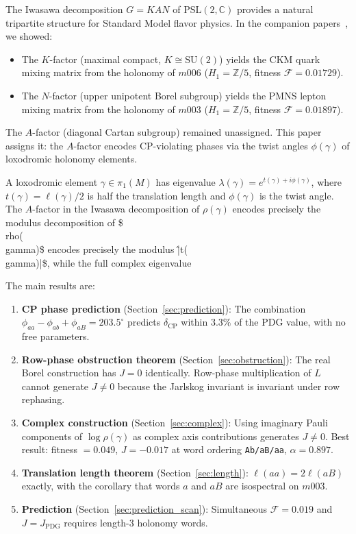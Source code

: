 \documentclass[floatfix,aps,prd,twocolumn,showpacs,superscriptaddress,longbibliography]{revtex4-2}
\newcommand{\PSL}{\mathrm{PSL}(2,\mathbb{C})}
\newcommand{\SUtwo}{\mathrm{SU}(2)}
\begin{document}
The Iwasawa decomposition $G = KAN$ of $\PSL$ provides a natural
tripartite structure for Standard Model flavor physics.
In the companion papers~\cite{Gentry:CKM,Gentry:PMNS}, we showed:
\begin{itemize}
\item The $K$-factor (maximal compact, $K \cong \SUtwo$) yields the
CKM quark mixing matrix from the holonomy of $m006$
($H_1 = \mathbb{Z}/5$, fitness $\mathcal{F} = 0.01729$).
\item The $N$-factor (upper unipotent Borel subgroup) yields the
PMNS lepton mixing matrix from the holonomy of $m003$
($H_1 = \mathbb{Z}/5$, fitness $\mathcal{F} = 0.01897$).
\end{itemize}
The $A$-factor (diagonal Cartan subgroup) remained unassigned.
This paper assigns it: the $A$-factor encodes CP-violating phases
via the twist angles $\phi(\gamma)$ of loxodromic holonomy elements.

A loxodromic element $\gamma \in \pi_1(M)$ has eigenvalue
$\lambda(\gamma) = e^{t(\gamma) + i\phi(\gamma)}$, where
$t(\gamma) = \ell(\gamma)/2$ is half the translation length and
$\phi(\gamma)$ is the twist angle. The $A$-factor in the Iwasawa
decomposition of $\rho(\gamma)$ encodes precisely the modulus
decomposition of \$\\rho(\\gamma)\$ encodes precisely the modulus
\^{|t(\\gamma)|}\$, while the full complex eigenvalue

The main results are:
\begin{enumerate}
\item \textbf{CP phase prediction} (Section~\ref{sec:prediction}):
The combination $\phi_{aa} - \phi_{ab} + \phi_{aB} = 203.5^\circ$
predicts $\delta_{\mathrm{CP}}$ within $3.3\%$ of the PDG value,
with no free parameters.

\item \textbf{Row-phase obstruction theorem}
(Section~\ref{sec:obstruction}):
The real Borel construction has $J = 0$ identically.
Row-phase multiplication of $L$ cannot generate $J \neq 0$
because the Jarlskog invariant is invariant under row rephasing.

\item \textbf{Complex construction}
(Section~\ref{sec:complex}):
Using imaginary Pauli components of $\log\rho(\gamma)$ as
complex axis contributions generates $J \neq 0$.
Best result: fitness $= 0.049$, $J = -0.017$ at word ordering
\texttt{Ab/aB/aa}, $\alpha = 0.897$.

\item \textbf{Translation length theorem}
(Section~\ref{sec:length}):
$\ell(aa) = 2\ell(aB)$ exactly, with the corollary that
words $a$ and $aB$ are isospectral on $m003$.

\item \textbf{Prediction}
(Section~\ref{sec:prediction_scan}):
Simultaneous $\mathcal{F} = 0.019$ and $J = J_{\mathrm{PDG}}$
requires length-3 holonomy words.
\end{enumerate}
\end{document}
